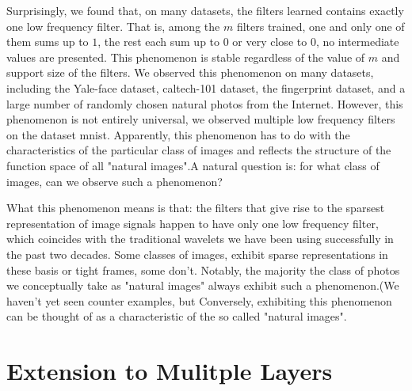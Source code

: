 \documentclass[a4paper]{article}
\begin{document}
Surprisingly, we found that, on many datasets, the filters learned contains exactly one low frequency filter. That is, among the $m$ filters trained, one and only one of them sums up to $1$, the rest each sum up to $0$ or very close to $0$, no intermediate values are presented. This phenomenon is stable regardless of the value of $m$ and support size of the filters. We observed this phenomenon on many datasets, including the Yale-face dataset, caltech-101 dataset, the fingerprint dataset, and a large number of randomly chosen natural photos from the Internet. However, this phenomenon is not entirely universal, we observed multiple low frequency filters on the dataset mnist. Apparently, this phenomenon has to do with the characteristics of the particular class of images and reflects the structure of the function space of all "natural images".A natural question is: for what class of images, can we observe such a phenomenon?

What this phenomenon means is that: the filters that give rise to the sparsest representation of image signals happen to have only one low frequency filter, which coincides with the traditional wavelets we have been using successfully in the past two decades. Some classes of images, exhibit sparse representations in these basis or tight frames, some don't. Notably, the majority the class of photos we conceptually take as "natural images" always exhibit such a phenomenon.(We haven't yet seen counter examples, but  Conversely, exhibiting this phenomenon can be thought of as a characteristic of the so called "natural images". 

\section{Extension to Mulitple Layers}
\end{document}
